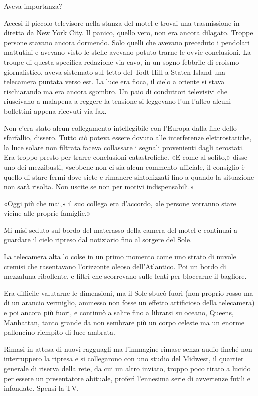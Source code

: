 Aveva importanza?

Accesi il piccolo televisore nella stanza del motel e trovai una
trasmissione in diretta da New York City. Il panico, quello vero, non
era ancora dilagato. Troppe persone stavano ancora dormendo. Solo quelli
che avevano preceduto i pendolari mattutini e avevano visto le stelle
avevano potuto trarne le ovvie conclusioni. La troupe di questa
specifica redazione via cavo, in un sogno febbrile di eroismo
giornalistico, aveva sistemato sul tetto del Todt Hill a Staten Island
una telecamera puntata verso est. La luce era fioca, il cielo a oriente
si stava rischiarando ma era ancora sgombro. Un paio di conduttori
televisivi che riuscivano a malapena a reggere la tensione si leggevano
l'un l'altro alcuni bollettini appena ricevuti via fax.

Non c'era stato alcun collegamento intellegibile con l'Europa dalla fine
dello sfarfallio, dissero. Tutto ciò poteva essere dovuto alle
interferenze elettrostatiche, la luce solare non filtrata faceva
collassare i segnali provenienti dagli aerostati. Era troppo presto per
trarre conclusioni catastrofiche. «E come al solito,» disse uno dei
mezzibusti, «sebbene non ci sia alcun commento ufficiale, il consiglio è
quello di stare fermi dove siete e rimanere sintonizzati fino a quando
la situazione non sarà risolta. Non uscite se non per motivi
indispensabili.»

«Oggi più che mai,» il suo collega era d'accordo, «le persone vorranno
stare vicine alle proprie famiglie.»

Mi misi seduto sul bordo del materasso della camera del motel e
continuai a guardare il cielo ripreso dal notiziario fino al sorgere del
Sole.

La telecamera alta lo colse in un primo momento come uno strato di
nuvole cremisi che rasentavano l'orizzonte oleoso dell'Atlantico. Poi un
bordo di mezzaluna ribollente, e filtri che scorrevano sulle lenti per
bloccarne il bagliore.

Era difficile valutarne le dimensioni, ma il Sole sbucò fuori (non
proprio rosso ma di un arancio vermiglio, ammesso non fosse un effetto
artificioso della telecamera) e poi ancora più fuori, e continuò a
salire fino a librarsi su oceano, Queens, Manhattan, tanto grande da non
sembrare più un corpo celeste ma un enorme palloncino riempito di luce
ambrata.

Rimasi in attesa di nuovi ragguagli ma l'immagine rimase senza audio
finché non interruppero la ripresa e si collegarono con uno studio del
Midwest, il quartier generale di riserva della rete, da cui un altro
inviato, troppo poco tirato a lucido per essere un presentatore
abituale, proferì l'ennesima serie di avvertenze futili e infondate.
Spensi la TV.

